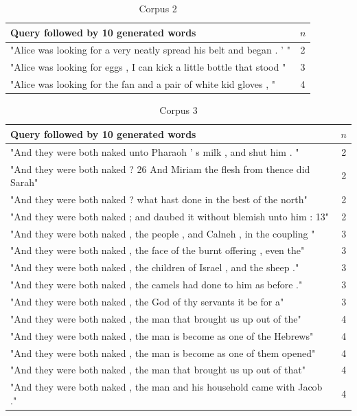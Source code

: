 \documentclass[a4paper,12pt]{article}
\begin{document}
\begin{table}
\begin{tabular}{| l |c|}
\hline
Query followed by 10 generated words & $n$ \\ \hline
"Alice was looking for a very neatly spread his belt and began . ' " & 2\\ \hline
"Alice was looking for eggs , I can kick a little bottle that stood "& 3 \\ \hline
"Alice was looking for the fan and a pair of white kid gloves , " & 4 \\ \hline
\end{tabular}
\caption{Corpus 2}
\label{tab:corpus2}
\end{table}
\begin{table}
\begin{tabular}{| l |c|}
\hline
Query followed by 10 generated words & $n$ \\ \hline
"And they were both naked unto Pharaoh ' s milk , and shut him . " & 2\\ \hline
"And they were both naked ? 26 And Miriam the flesh from thence did Sarah"& 2 \\ \hline
"And they were both naked ? what hast done in the best of the north" & 2 \\ \hline
"And they were both naked ; and daubed it without blemish unto him : 13" & 2 \\ \hline

"And they were both naked , the people , and Calneh , in the coupling " & 3 \\ \hline
"And they were both naked , the face of the burnt offering , even the" & 3 \\ \hline
"And they were both naked , the children of Israel , and the sheep ." & 3 \\ \hline
"And they were both naked , the camels had done to him as before ." & 3 \\ \hline
"And they were both naked , the God of thy servants it be for a" & 3 \\ \hline

"And they were both naked , the man that brought us up out of the" & 4 \\ \hline
"And they were both naked , the man is become as one of the Hebrews" & 4 \\ \hline
"And they were both naked , the man is become as one of them opened" & 4 \\ \hline
"And they were both naked , the man that brought us up out of that" & 4 \\ \hline
"And they were both naked , the man and his household came with Jacob ." & 4 \\ \hline

\end{tabular}
\caption{ Corpus 3}
\label{tab:corpus3}
\end{table}
\end{document}
